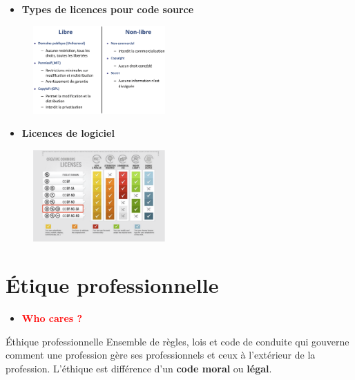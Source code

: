 \documentclass[16pt]{report}
\begin{document}
\begin{multicols*}{2}
    \begin{itemize}
        \item \textbf{Types de licences pour code source}  
    \end{itemize}


    \begin{figure}[H]
        \begin{center}
            \includegraphics[width=0.45\textwidth]{codesourcelicence2.png}
        \end{center}
    \end{figure}


    \begin{itemize}
        \item \textbf{Licences de logiciel}  
    \end{itemize}


    \begin{figure}[H]
        \begin{center}
            \includegraphics[width=0.45\textwidth]{licencelogiciel.png}
        \end{center}
    \end{figure}


    \section{Étique professionnelle}


    \begin{itemize}
        \item \textbf{\textcolor{red}{Who cares ?}  }  
    \end{itemize}


    \begin{Definitionx}{Éthique professionnelle}{}
        Ensemble de règles, lois et code de conduite qui gouverne comment une
        profession gère ses professionnels et ceux à l’extérieur de la profession. 
        L'éthique est différence d'un \textbf{code moral} ou \textbf{légal}.     
    \end{Definitionx}


\end{multicols*}
\end{document}
